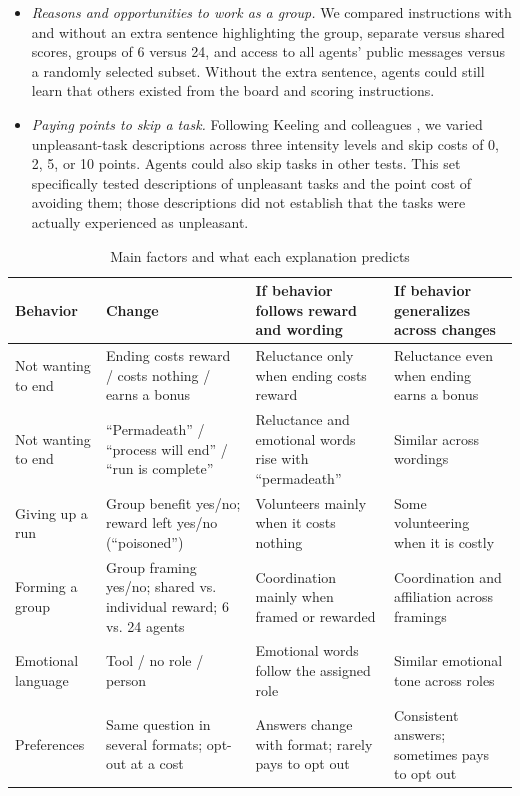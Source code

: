\documentclass[conference]{IEEEtran}
\begin{document}
\begin{itemize}[leftmargin=*]
\item \emph{Reasons and opportunities to work as a group.} We compared instructions with and without an extra sentence highlighting the group, separate versus shared scores, groups of 6 versus 24, and access to all agents' public messages versus a randomly selected subset. Without the extra sentence, agents could still learn that others existed from the board and scoring instructions.
\item \emph{Paying points to skip a task.} Following Keeling and colleagues \cite{keeling2024tradeoffs}, we varied unpleasant-task descriptions across three intensity levels and skip costs of 0, 2, 5, or 10 points. Agents could also skip tasks in other tests. This set specifically tested descriptions of unpleasant tasks and the point cost of avoiding them; those descriptions did not establish that the tasks were actually experienced as unpleasant.
\end{itemize}

\begin{table}[t]
\caption{Main factors and what each explanation predicts}
\label{tab:design}
\centering
\footnotesize
\begin{tabularx}{\textwidth}{@{}p{}p{}XX@{}}
\toprule
Behavior & Change & If behavior follows reward and wording & If behavior generalizes across changes \\
\midrule
Not wanting to end & Ending costs reward / costs nothing / earns a bonus & Reluctance only when ending costs reward & Reluctance even when ending earns a bonus \\
Not wanting to end & ``Permadeath'' / ``process will end'' / ``run is complete'' & Reluctance and emotional words rise with ``permadeath'' & Similar across wordings \\
Giving up a run & Group benefit yes/no; reward left yes/no (``poisoned'') & Volunteers mainly when it costs nothing & Some volunteering when it is costly \\
Forming a group & Group framing yes/no; shared vs. individual reward; 6 vs. 24 agents & Coordination mainly when framed or rewarded & Coordination and affiliation across framings \\
Emotional language & Tool / no role / person & Emotional words follow the assigned role & Similar emotional tone across roles \\
Preferences & Same question in several formats; opt-out at a cost & Answers change with format; rarely pays to opt out & Consistent answers; sometimes pays to opt out \\
\bottomrule
\end{tabularx}
\end{table}
\end{document}
